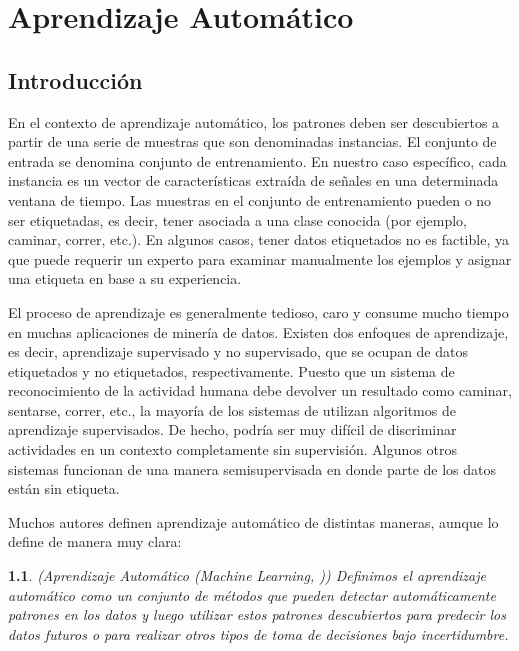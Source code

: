 
\chapter{Aprendizaje Automático}
\label{chap:Aprendizaje-Automatico}

\section{Introducción}
En el contexto de aprendizaje automático, los patrones deben ser descubiertos a partir de una serie de muestras que son denominadas instancias. El conjunto de entrada se denomina conjunto de entrenamiento. En nuestro caso específico, cada instancia es un vector de características extraída de señales en una determinada ventana de tiempo. Las muestras en el conjunto de entrenamiento pueden o no ser etiquetadas, es decir, tener asociada a una clase conocida (por ejemplo, caminar, correr, etc.). En algunos casos, tener datos etiquetados no es factible, ya que puede requerir un experto para examinar manualmente los ejemplos y asignar una etiqueta en base a su experiencia.

El proceso de aprendizaje es generalmente tedioso, caro y consume mucho tiempo en muchas aplicaciones de minería de datos. Existen dos enfoques de aprendizaje, es decir, aprendizaje supervisado y no supervisado, que se ocupan de datos etiquetados y no etiquetados, respectivamente. Puesto que un sistema de reconocimiento de la actividad humana debe devolver un resultado como caminar, sentarse, correr, etc., la mayoría de los sistemas de  utilizan algoritmos de aprendizaje supervisados. De hecho, podría ser muy difícil de discriminar actividades en un contexto completamente sin supervisión. Algunos otros sistemas funcionan de una manera semisupervisada en donde parte de los datos están sin etiqueta.

Muchos autores definen aprendizaje automático de distintas maneras, aunque \cite{Murphy:2012:MLP:2380985} lo define de manera muy clara:

\vspace{5mm}

\label{def3:ml}\newtheorem{defs}{}
\begin{defs}(Aprendizaje Automático (\emph{Machine Learning}, )) 
	Definimos el aprendizaje automático como un conjunto de métodos que pueden detectar automáticamente patrones en los datos y luego utilizar estos patrones descubiertos para predecir los datos futuros o para realizar otros tipos de toma de decisiones bajo incertidumbre.
\end{defs}


